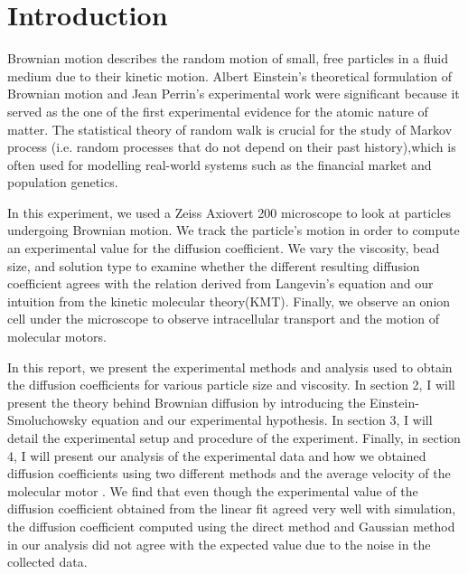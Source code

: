 \documentclass[iop,revtex4]{emulateapj_mod}
\begin{document}
\section{Introduction}\label{sec:intro}
\par Brownian motion describes the random motion of small, free particles in a fluid medium due to their kinetic motion.  Albert Einstein's theoretical formulation of Brownian motion and Jean Perrin's experimental work were significant because it served as the one of the first experimental evidence for the  atomic nature of matter. The statistical theory of  random walk is crucial for the study of Markov process (i.e. random processes that do not depend on their past history),which is often used for modelling real-world systems such as the financial market and population genetics. %
\par In this experiment, we used a Zeiss Axiovert 200 microscope to look at particles undergoing Brownian motion. We track the particle's motion in order to compute an experimental value for the diffusion coefficient. We vary the viscosity, bead size, and solution type to examine whether the different resulting diffusion coefficient agrees with the relation derived from Langevin's equation and our intuition from the kinetic molecular theory(KMT). Finally, we observe an onion cell under the microscope to observe intracellular transport and the motion of molecular motors.
\par In this report, we present the experimental methods and analysis used to obtain the diffusion coefficients for various particle size and viscosity. In section 2, I will present the theory behind Brownian diffusion by introducing the Einstein-Smoluchowsky equation and our experimental hypothesis. In section 3, I will detail the experimental setup and procedure of the experiment. Finally, in section 4,  I will present our analysis of the experimental data and how we obtained diffusion coefficients using two different methods and the average velocity of the molecular motor . We find that even though the experimental value of the diffusion coefficient obtained from the linear fit agreed very well with simulation, the diffusion coefficient computed using the direct method and Gaussian method in our analysis did not agree with the expected value due to the noise in the collected data.
\end{document}
